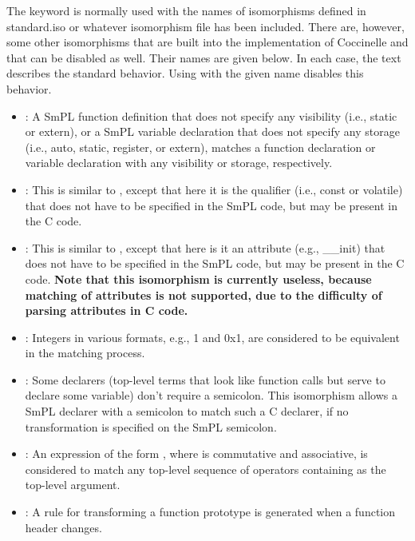 The keyword  is normally used with the names of
isomorphisms defined in standard.iso or whatever isomorphism file has been
included.  There are, however, some other isomorphisms that are built into
the implementation of Coccinelle and that can be disabled as well.  Their
names are given below.  In each case, the text describes the standard
behavior.  Using  with the given name disables this behavior.

\begin{itemize}
\item {}: A SmPL function definition that does not
  specify any visibility (i.e., static or extern), or a SmPL variable
  declaration that does not specify any storage (i.e., auto, static,
  register, or extern), matches a function declaration or variable
  declaration with any visibility or storage, respectively.
\item {}: This is similar to ,
  except that here it is the qualifier (i.e., const or volatile) that does
  not have to be specified in the SmPL code, but may be present in the C code.
\item {}: This is similar to
  , except that here is it an attribute (e.g.,
  \_\_init) that does not have to be specified in the SmPL code, but may be
  present in the C code.  \textbf{Note that this isomorphism is currently
    useless, because matching of attributes is not supported, due to the
    difficulty of parsing attributes in C code.}
\item {}: Integers in various formats, e.g., 1 and 0x1, are
  considered to be equivalent in the matching process.
\item {}: Some declarers (top-level terms
  that look like function calls but serve to declare some variable) don't
  require a semicolon.  This isomorphism allows a SmPL declarer with a semicolon
  to match such a C declarer, if no transformation is specified on the SmPL
  semicolon.
\item {}: An expression of the form  
  , where  is commutative and associative, is
  considered to match any top-level sequence of  operators
  containing  as the top-level argument.
\item {}: A rule for transforming a function prototype is
  generated when a function header changes.
\end{itemize}

